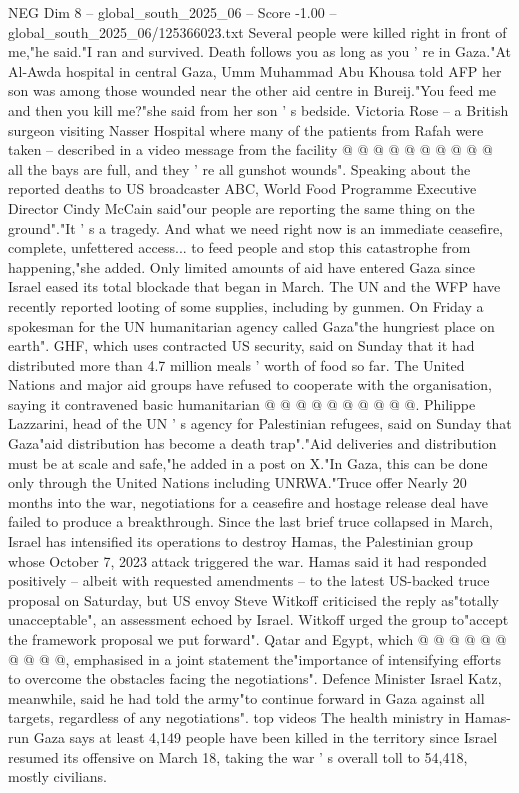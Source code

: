 \begin{textsample}{NEG Dim 8 – global\_south\_2025\_06 – Score -1.00 – global\_south\_2025\_06/125366023.txt}
Several people were killed right in front of me,"he said."I ran and survived.
Death follows you as long as you ' re in Gaza."At Al-Awda hospital in central Gaza, Umm Muhammad Abu Khousa told AFP her son was among those wounded near the other aid centre in Bureij."You feed me and then you kill me?"she said from her son ' s bedside.
Victoria Rose -- a British surgeon visiting Nasser Hospital where many of the patients from Rafah were taken -- described in a video message from the facility @ @ @ @ @ @ @ @ @ @ all the bays are full, and they ' re all gunshot wounds".
Speaking about the reported deaths to US broadcaster ABC, World Food Programme Executive Director Cindy McCain said"our people are reporting the same thing on the ground"."It ' s a tragedy.
And what we need right now is an immediate ceasefire, complete, unfettered access... to feed people and stop this catastrophe from happening,"she added.
Only limited amounts of aid have entered Gaza since Israel eased its total blockade that began in March.
The UN and the WFP have recently reported looting of some supplies, including by gunmen.
On Friday a spokesman for the UN humanitarian agency called Gaza"the hungriest place on earth".
GHF, which uses contracted US security, said on Sunday that it had distributed more than 4.7 million meals ' worth of food so far.
The United Nations and major aid groups have refused to cooperate with the organisation, saying it contravened basic humanitarian @ @ @ @ @ @ @ @ @ @.
Philippe Lazzarini, head of the UN ' s agency for Palestinian refugees, said on Sunday that Gaza"aid distribution has become a death trap"."Aid deliveries and distribution must be at scale and safe,"he added in a post on X."In Gaza, this can be done only through the United Nations including UNRWA."Truce offer Nearly 20 months into the war, negotiations for a ceasefire and hostage release deal have failed to produce a breakthrough.
Since the last brief truce collapsed in March, Israel has intensified its operations to destroy Hamas, the Palestinian group whose October 7, 2023 attack triggered the war.
Hamas said it had responded positively -- albeit with requested amendments -- to the latest US-backed truce proposal on Saturday, but US envoy Steve Witkoff criticised the reply as"totally unacceptable", an assessment echoed by Israel.
Witkoff urged the group to"accept the framework proposal we put forward".
Qatar and Egypt, which @ @ @ @ @ @ @ @ @ @, emphasised in a joint statement the"importance of intensifying efforts to overcome the obstacles facing the negotiations".
Defence Minister Israel Katz, meanwhile, said he had told the army"to continue forward in Gaza against all targets, regardless of any negotiations". top videos The health ministry in Hamas-run Gaza says at least 4,149 people have been killed in the territory since Israel resumed its offensive on March 18, taking the war ' s overall toll to 54,418, mostly civilians.

\end{textsample}
